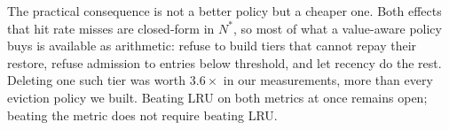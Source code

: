 \documentclass[letterpaper,twocolumn,10pt]{article}
\begin{document}
The practical consequence is not a better policy but a cheaper one. Both effects that hit rate misses are closed-form in $N^{*}$, so most of what a value-aware policy buys is available as arithmetic: refuse to build tiers that cannot repay their restore, refuse admission to entries below threshold, and let recency do the rest. Deleting one such tier was worth $3.6\times$ in our measurements, more than every eviction policy we built. Beating LRU on both metrics at once remains open; beating the metric does not require beating LRU.

\balance


\end{document}
